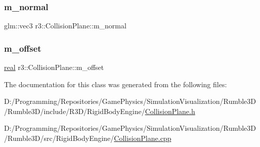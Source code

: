 \mbox{\label{classr3_1_1_collision_plane_ab65e832434d2da433e79c93ac12f4b43}} 
\subsubsection{\texorpdfstring{m\+\_\+normal}{m\_normal}}
{\footnotesize\ttfamily glm\+::vec3 r3\+::\+Collision\+Plane\+::m\+\_\+normal\hspace{0.3cm}{\ttfamily [protected]}}

\mbox{\label{classr3_1_1_collision_plane_a8ae3c28197b05088e405ff9944632f74}} 
\subsubsection{\texorpdfstring{m\+\_\+offset}{m\_offset}}
{\footnotesize\ttfamily \mbox{\hyperlink{namespacer3_ab2016b3e3f743fb735afce242f0dc1eb}{real}} r3\+::\+Collision\+Plane\+::m\+\_\+offset\hspace{0.3cm}{\ttfamily [protected]}}



The documentation for this class was generated from the following files\+:\begin{DoxyCompactItemize}
\item 
D\+:/\+Programming/\+Repositories/\+Game\+Physics/\+Simulation\+Visualization/\+Rumble3\+D/\+Rumble3\+D/include/\+R3\+D/\+Rigid\+Body\+Engine/\mbox{\hyperlink{_collision_plane_8h}{Collision\+Plane.\+h}}\item 
D\+:/\+Programming/\+Repositories/\+Game\+Physics/\+Simulation\+Visualization/\+Rumble3\+D/\+Rumble3\+D/src/\+Rigid\+Body\+Engine/\mbox{\hyperlink{_collision_plane_8cpp}{Collision\+Plane.\+cpp}}\end{DoxyCompactItemize}
